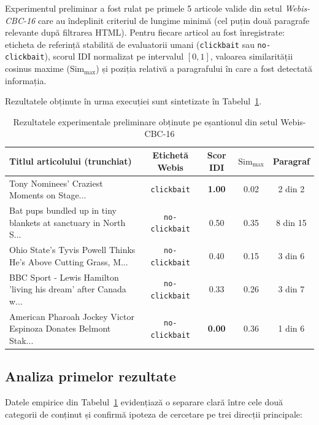 \documentclass[12pt, a4paper]{article}
\begin{document}
Experimentul preliminar a fost rulat pe primele 5 articole valide din setul \textit{Webis-CBC-16} care au îndeplinit criteriul de lungime minimă (cel puțin două paragrafe relevante după filtrarea HTML). Pentru fiecare articol au fost înregistrate: eticheta de referință stabilită de evaluatorii umani (\texttt{clickbait} sau \texttt{no-clickbait}), scorul IDI normalizat pe intervalul $[0, 1]$, valoarea similarității cosinus maxime ($\text{Sim}_{\max}$) și poziția relativă a paragrafului în care a fost detectată informația.

Rezultatele obținute în urma execuției sunt sintetizate în Tabelul~\ref{tab:rezultate_preliminare}.

\begin{table}[htbp]
\centering
\caption{Rezultatele experimentale preliminare obținute pe eșantionul din setul Webis-CBC-16}
\label{tab:rezultate_preliminare}
\begin{tabular}{|p{5.5cm}|c|c|c|c|}
\hline
\textbf{Titlul articolului (trunchiat)} & \textbf{Etichetă Webis} & \textbf{Scor IDI} & \textbf{$\text{Sim}_{\max}$} & \textbf{Paragraf} \\
\hline
Tony Nominees' Craziest Moments on Stage... & \texttt{clickbait} & \textbf{1.00} & 0.02 & 2 din 2 \\
\hline
Bat pups bundled up in tiny blankets at sanctuary in North S... & \texttt{no-clickbait} & 0.50 & 0.35 & 8 din 15 \\
\hline
Ohio State's Tyvis Powell Thinks He's Above Cutting Grass, M... & \texttt{no-clickbait} & 0.40 & 0.15 & 3 din 6 \\
\hline
BBC Sport - Lewis Hamilton 'living his dream' after Canada w... & \texttt{no-clickbait} & 0.33 & 0.26 & 3 din 7 \\
\hline
American Pharoah Jockey Victor Espinoza Donates Belmont Stak... & \texttt{no-clickbait} & \textbf{0.00} & 0.36 & 1 din 6 \\
\hline
\end{tabular}
\end{table}

\subsection{Analiza primelor rezultate}

Datele empirice din Tabelul~\ref{tab:rezultate_preliminare} evidențiază o separare clară între cele două categorii de conținut și confirmă ipoteza de cercetare pe trei direcții principale:
\end{document}

